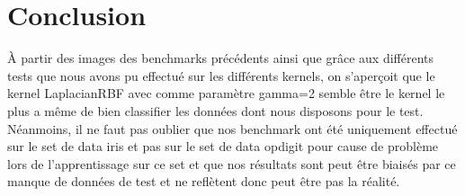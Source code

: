 \documentclass[fontsize=10pt, twoside=no]{scrartcl} %
\begin{document}
\part{Conclusion}

\`A partir des images des benchmarks précédents ainsi que grâce aux différents tests que nous avons pu effectué sur les différents kernels, on s'aperçoit que le kernel LaplacianRBF avec comme paramètre gamma=2 semble être le kernel le plus a même de bien classifier les données dont nous disposons pour le test. Néanmoins, il ne faut pas oublier que nos benchmark ont été uniquement effectué sur le set de data iris et pas sur le set de data opdigit pour cause de problème lors de l'apprentissage sur ce set et que nos résultats sont peut être biaisés par ce manque de données de test et ne reflètent donc peut être pas la réalité.
\end{document}
